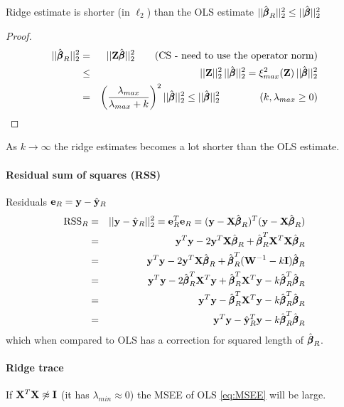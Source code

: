 \begin{proposition}
Ridge estimate is shorter (in $\ell_2$) than the OLS estimate $||\hat{\pmb{\beta}}_R||_2^2 \leq ||\hat{\pmb{\beta}}||_2^2$
\end{proposition}
\begin{proof}
\begin{eqnarray}
||\hat{\pmb{\beta}}_R||_2^2 & = & ||\mathbf{Z} \hat{\pmb{\beta}}||_2^2 \qquad \text{(CS - need to use the operator norm)} \nonumber \\
& \leq & ||\mathbf{Z}||_2^2 \, ||\hat{\pmb{\beta}}||_2^2 
= \xi_{max}^2(\mathbf{Z}) \, ||\hat{\pmb{\beta}}||_2^2 \nonumber \\
& = & \left( \frac{\lambda_{max}}{\lambda_{max}+k} \right)^2 ||\hat{\pmb{\beta}}||_2^2 \leq ||\hat{\pmb{\beta}}||_2^2 \qquad \qquad (k, \lambda_{max} \geq 0) 
\end{eqnarray}
\end{proof}
As $k \to \infty$ the ridge estimates becomes a lot shorter than the OLS estimate.

\paragraph{Residual sum of squares (RSS)}
Residuals $\mathbf{e}_R = \mathbf{y} - \hat{\mathbf{y}}_R$
\begin{eqnarray*}
\text{RSS}_R & = & ||\mathbf{y} - \hat{\mathbf{y}}_R||_2^2 = \mathbf{e}^T_R \mathbf{e}_R = (\mathbf{y} - \mathbf{X} \hat{\pmb{\beta}}_R)^T (\mathbf{y} - \mathbf{X} \hat{\pmb{\beta}}_R) \\
& = & \mathbf{y}^T \mathbf{y} - 2 \mathbf{y}^T \mathbf{X} \hat{\pmb{\beta}}_R  + \hat{\pmb{\beta}}^T_R \mathbf{X}^T \mathbf{X} \hat{\pmb{\beta}}_R \\
& = & \mathbf{y}^T \mathbf{y} - 2 \mathbf{y}^T \mathbf{X} \hat{\pmb{\beta}}_R  + \hat{\pmb{\beta}}^T_R (\mathbf{W}^{-1} - k\mathbf{I}) \hat{\pmb{\beta}}_R \\
& = & \mathbf{y}^T \mathbf{y} - 2 \hat{\pmb{\beta}}_R^T \mathbf{X}^T \mathbf{y} + \hat{\pmb{\beta}}^T_R \mathbf{X}^T \mathbf{y} - k \hat{\pmb{\beta}}^T_R \hat{\pmb{\beta}}_R \\
& = & \mathbf{y}^T \mathbf{y} - \hat{\pmb{\beta}}_R^T \mathbf{X}^T \mathbf{y} - k \hat{\pmb{\beta}}^T_R \hat{\pmb{\beta}}_R \\
& = & \mathbf{y}^T \mathbf{y} - \hat{\mathbf{y}}^T_R \mathbf{y} - k \hat{\pmb{\beta}}^T_R \hat{\pmb{\beta}}_R \\
\end{eqnarray*}
which when compared to OLS has a correction for squared length of $\hat{\pmb{\beta}}_R$.

\paragraph{Ridge trace} If $\mathbf{X}^T \mathbf{X} \not\approx \mathbf{I}$ (it has $\lambda_{min} \approx 0$) the MSEE of OLS \eqref{eq:MSEE} will be large.

